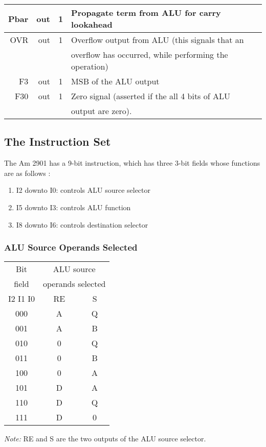 \begin{center}
\begin{tabular}{|r|r|c|l|}
  Pbar &   out & 1   & Propagate term from ALU for carry lookahead            \\ \hline
   OVR &   out & 1   & Overflow output from ALU (this signals that an         \\
       &       &     & overflow has occurred, while performing the operation) \\ \hline
    F3 &   out & 1   & MSB of the ALU output                                  \\ \hline
   F30 &   out & 1   & Zero signal (asserted if the all 4 bits of ALU        \\
       &       &     &      output are zero).                                 \\ \hline
\end{tabular}
\end{center}

\subsection*{The Instruction Set}

The Am 2901 has a 9-bit instruction, which has three 3-bit fields whose 
functions are as follows :
\begin{enumerate}
\item
I2 downto I0: controls ALU source selector
\item
I5 downto I3: controls ALU function
\item
I8 downto I6: controls destination selector
\end{enumerate}

\subsubsection{ALU Source Operands Selected}

\begin{center}
\begin{tabular}{|c|c|c|} \hline
      Bit        &  \multicolumn{2}{c|}{ALU source} \\ 
     field       &  \multicolumn{2}{c|}{operands selected} \\ \hline
   I2 I1 I0      &       RE       &      S        \\  \hline
      000        &       A        &      Q        \\  \hline
      001        &       A        &      B        \\  \hline
      010        &       0        &      Q        \\  \hline
      011        &       0        &      B        \\  \hline
      100        &       0        &      A        \\  \hline
      101        &       D        &      A        \\  \hline
      110        &       D        &      Q        \\  \hline
      111        &       D        &      0        \\  \hline
\end{tabular}
\end{center}
{\em Note:} RE and S are the two outputs of the ALU source selector. 


